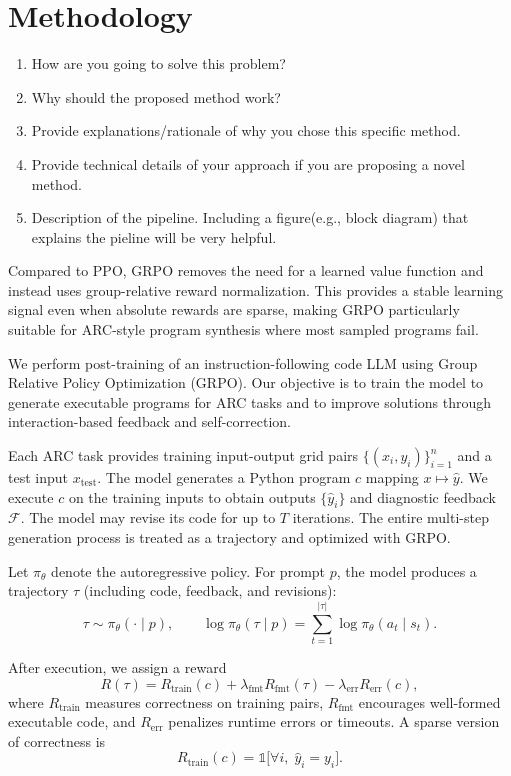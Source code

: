 \documentclass[11pt,letterpaper]{article}
\begin{document}
\section{Methodology}
{\color{red}
\begin{enumerate}
    \item How are you going to solve this problem?
    \item Why should the proposed method work?
    \item Provide explanations/rationale of why you chose this specific method.
    \item Provide technical details of your approach if you are proposing a novel method.
    \item Description of the pipeline. Including a figure(e.g., block diagram) that explains the pieline will be very helpful.
\end{enumerate}
}


Compared to PPO, GRPO removes the need for a learned value function and instead uses group-relative reward normalization. This provides a stable learning signal even when absolute rewards are sparse, making GRPO particularly suitable for ARC-style program synthesis where most sampled programs fail.

We perform post-training of an instruction-following code LLM using Group Relative Policy Optimization (GRPO). Our objective is to train the model to generate executable programs for ARC tasks and to improve solutions through interaction-based feedback and self-correction. \cite{shao2024deepseekmathpushinglimitsmathematical}

Each ARC task provides training input-output grid pairs $\{(x_i, y_i)\}_{i=1}^n$ and a test input $x_{\text{test}}$. The model generates a Python program $c$ mapping $x \mapsto \hat y$. We execute $c$ on the training inputs to obtain outputs $\{\hat y_i\}$ and diagnostic feedback $\mathcal{F}$. The model may revise its code for up to $T$ iterations. The entire multi-step generation process is treated as a trajectory and optimized with GRPO.

Let $\pi_\theta$ denote the autoregressive policy. For prompt $p$, the model produces a trajectory $\tau$ (including code, feedback, and revisions):
\[
\tau \sim \pi_\theta(\cdot \mid p), \qquad 
\log \pi_\theta(\tau\mid p)=\sum_{t=1}^{|\tau|}\log \pi_\theta(a_t\mid s_t).
\]

After execution, we assign a reward
\[
R(\tau) = R_{\text{train}}(c) + \lambda_{\text{fmt}} R_{\text{fmt}}(\tau) - \lambda_{\text{err}} R_{\text{err}}(c),
\]
where $R_{\text{train}}$ measures correctness on training pairs, $R_{\text{fmt}}$ encourages well-formed executable code, and $R_{\text{err}}$ penalizes runtime errors or timeouts. A sparse version of correctness is
\[
R_{\text{train}}(c)=\mathbb{1}\big[\forall i,\; \hat y_i = y_i\big].
\]
\end{document}
